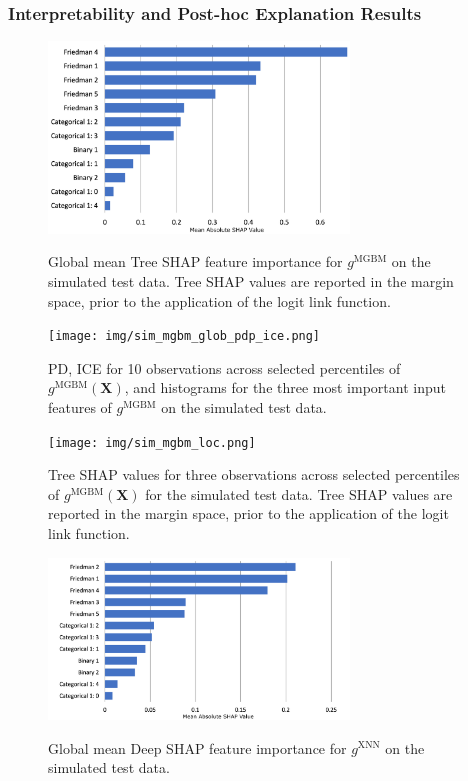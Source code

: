 \documentclass[information,article,submit,moreauthors,pdftex]{definitions/mdpi}
\begin{document}
\subsubsection{Interpretability and Post-hoc Explanation Results}

\begin{figure}[H]
\centering
\includegraphics[width=8cm]{img/sim_mgbm_glob.png}
\label{fig:sim_mgbm_glob}
\caption{Global mean Tree SHAP feature importance for $g^\text{MGBM}$ on the simulated test data. Tree SHAP values are reported in the margin space, prior to the application of the logit link function.}
\end{figure}   

\begin{figure}[H]
\centering
\texttt{[image: img/sim\_mgbm\_glob\_pdp\_ice.png]}
\label{fig:sim_mgbm_glob_pdp_ice}
\caption{PD, ICE for 10 observations across selected percentiles of $g^\text{MGBM}(\mathbf{X})$, and histograms for the three most important input features of $g^\text{MGBM}$ on the simulated test data.}
\end{figure}   


\begin{figure}[H]
\centering
\texttt{[image: img/sim\_mgbm\_loc.png]}
\label{fig:sim_mgbm_loc}
\caption{Tree SHAP values for three observations across selected percentiles of $g^\text{MGBM}(\mathbf{X})$ for the simulated test data. Tree SHAP values are reported in the margin space, prior to the application of the logit link function.}
\end{figure}   

\begin{figure}[H]
\centering
\includegraphics[width=8cm]{img/sim_xnn_glob.png}
\label{fig:sim_xnn_glob}
\caption{Global mean Deep SHAP feature importance for $g^\text{XNN}$ on the simulated test data.}
\end{figure} 
\end{document}
